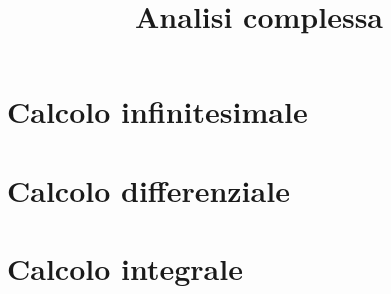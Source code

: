 \documentclass[a4paper,12pt]{article}
\begin{document}
\title{Analisi complessa}

\maketitle

\section{Calcolo infinitesimale}

\section{Calcolo differenziale}
\section{Calcolo integrale}
\end{document}
